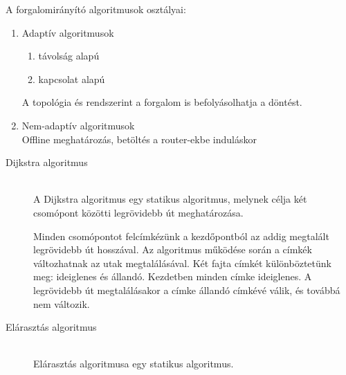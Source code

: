 \documentclass[margin=0px]{article}
\begin{document}
\begin{description}
				A forgalomirányító algoritmusok osztályai:
				\begin{enumerate}
					\item Adaptív algoritmusok
					\begin{enumerate}
						\item távolság alapú
						\item kapcsolat alapú
					\end{enumerate}
						A topológia és rendszerint a forgalom is befolyásolhatja a döntést.
					\item Nem-adaptív algoritmusok \\
						Offline meghatározás, betöltés a router-ekbe induláskor
				\end{enumerate}
			
				\begin{description}
					\item[Dijkstra algoritmus] \hfill \\
						A Dijkstra algoritmus egy statikus algoritmus, melynek célja két csomópont közötti legrövidebb út meghatározása.

						Minden csomópontot felcímkézünk a kezdőpontból az addig megtalált legrövidebb út hosszával. Az algoritmus működése során a címkék változhatnak az utak megtalálásával. Két fajta címkét különböztetünk meg: ideiglenes és állandó. Kezdetben minden címke ideiglenes. A legrövidebb út megtalálásakor a címke állandó címkévé válik, és továbbá nem változik.
					\item[Elárasztás algoritmus] \hfill \\
						Elárasztás algoritmusa egy statikus algoritmus.
						

\end{description}
\end{description}
\end{document}
